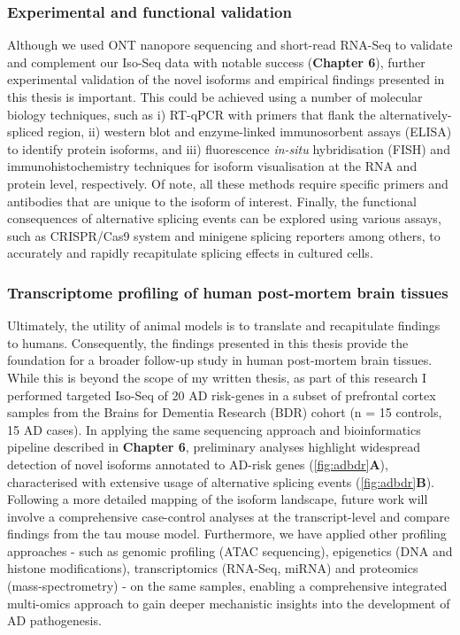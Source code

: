 \subsubsection{Experimental and functional validation}
Although we used ONT nanopore sequencing and short-read RNA-Seq to validate and complement our Iso-Seq data with notable success (\textbf{Chapter 6}), further experimental validation of the novel isoforms and empirical findings presented in this thesis is important. This could be achieved using a number of molecular biology techniques, such as i) RT-qPCR with primers that flank the alternatively-spliced region, ii) western blot and enzyme-linked immunosorbent assays (ELISA) to identify protein isoforms, and iii) fluorescence \textit{in-situ} hybridisation (FISH) and immunohistochemistry techniques for isoform visualisation at the RNA and protein level, respectively. Of note, all these methods require specific primers and antibodies that are unique to the isoform of interest. Finally, the functional consequences of alternative splicing events can be explored using various assays, such as CRISPR/Cas9 system and minigene splicing reporters among others, to accurately and rapidly recapitulate splicing effects in cultured cells.  


\subsubsection{Transcriptome profiling of human post-mortem brain tissues}  
Ultimately, the utility of animal models is to translate and recapitulate findings to humans. Consequently, the findings presented in this thesis provide the foundation for a broader follow-up study in human post-mortem brain tissues. While this is beyond the scope of my written thesis, as part of this research I performed targeted Iso-Seq of 20 AD risk-genes in a subset of prefrontal cortex samples from the Brains for Dementia Research (BDR) cohort (n = 15 controls, 15 AD cases). In applying the same sequencing approach and bioinformatics pipeline described in \textbf{Chapter 6}, preliminary analyses highlight widespread detection of novel isoforms annotated to AD-risk genes (\cref{fig:adbdr}\textbf{A}), characterised with extensive usage of alternative splicing events (\cref{fig:adbdr}\textbf{B}). Following a more detailed mapping of the isoform landscape, future work will involve a comprehensive case-control analyses at the transcript-level and compare findings from the tau mouse model. Furthermore, we have applied other profiling approaches - such as genomic profiling (ATAC sequencing), epigenetics (DNA and histone modifications), transcriptomics (RNA-Seq, miRNA) and proteomics (mass-spectrometry) - on the same samples, enabling a comprehensive integrated multi-omics approach to gain deeper mechanistic insights into the development of AD pathogenesis.     

